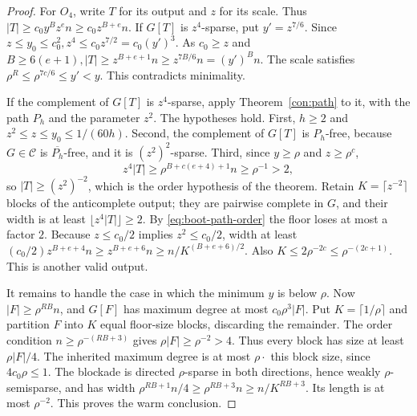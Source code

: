 \documentclass[11pt,a4paper]{article}
\theoremstyle{definition}
\theoremstyle{remark}
\numberwithin{equation}{section}
\begin{document}
\begin{proof}
For \(O_{4}\), write \(T\) for its output and \(z\) for its scale. Thus \(|T|\ge\allowbreak c_{0} y^{B} z^{e} n\ge\allowbreak c_{0} z^{B+e}n\). If \(G[T]\) is \(z^{4}\)-sparse, put \(y'=z^{7/6}\). Since \(z\le\allowbreak y_{0}\le\allowbreak c_{0}^{2},\allowbreak  z^{4}\le\allowbreak c_{0} z^{7/2}=c_{0}(y')^{3}\). As \(c_{0}\ge\allowbreak z\) and \(B\ge\allowbreak 6(e+1),\allowbreak  |T|\ge\allowbreak z^{B+e+1}n\ge\allowbreak z^{7B/6}n=(y')^{B} n\). The scale satisfies \(\rho^{R}\le\allowbreak \rho^{7c/6}\le\allowbreak y'<y\). This contradicts minimality.

If the complement of \(G[T]\) is \(z^{4}\)-sparse, apply Theorem~\ref{con:path} to it, with the path \(P_{h}\) and the parameter \(z^{2}\). The hypotheses hold. First, \(h\ge2\) and \(z^{2}\le z\le y_{0}\le 1/(60h)\). Second, the complement of \(G[T]\) is \(P_{h}\)-free, because \(G\in\mathcal C\) is \(\overline{P_{h}}\)-free, and it is \((z^{2})^{2}\)-sparse. Third, since \(y\ge \rho\) and \(z\ge \rho^{c}\),
\begin{equation}\label{eq:boot-path-order}
 z^{4}|T|\ge \rho^{B+c(e+4)+1}n\ge \rho^{-1}>2,
\end{equation}
so \(|T|\ge (z^{2})^{-2}\), which is the order hypothesis of the theorem. Retain \(K=\lceil z^{-2}\rceil\) blocks of the anticomplete output; they are pairwise complete in \(G\), and their width is at least \(\lfloor z^{4}|T|\rfloor\ge2\). By \eqref{eq:boot-path-order} the floor loses at most a factor \(2\). Because \(z\le\allowbreak c_{0}/2\) implies \(z^{2}\le\allowbreak c_{0}/2\), width at least \((c_{0}/2)z^{B+e+4}n\ge\allowbreak z^{B+e+6}n \ge\allowbreak n/K^{(B+e+6)/2}\). Also \(K\le\allowbreak 2\rho^{-2c}\le\allowbreak \rho^{-(2c+1)}\). This is another valid output.

It remains to handle the case in which the minimum \(y\) is below \(\rho\). Now \(|F|\ge\allowbreak \rho^{RB}n\), and \(G[F]\) has maximum degree at most \(c_{0} \rho^{3}|F|\). Put \(K=\lceil 1/\rho\rceil\) and partition \(F\) into \(K\) equal floor-size blocks, discarding the remainder. The order condition \(n\ge\allowbreak \rho^{-(RB+3)}\) gives \(\rho|F|\ge\allowbreak \rho^{-2}>4\). Thus every block has size at least \(\rho|F|/4\). The inherited maximum degree is at most \(\rho \cdot \) this block size, since \(4c_{0} \rho\le\allowbreak 1\). The blockade is directed \(\rho\)-sparse in both directions, hence weakly \(\rho\)-semisparse, and has width \(\rho^{RB+1}n/4\ge\allowbreak \rho^{RB+3}n\ge\allowbreak n/K^{RB+3}\). Its length is at most \(\rho^{-2}\). This proves the warm conclusion.
\end{proof}
\end{document}
